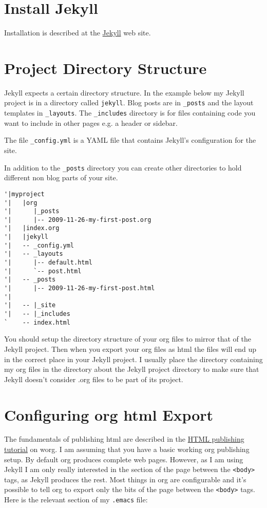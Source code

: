 \documentclass{article}
\begin{document}
\section{Install Jekyll}
\label{sec-2}


Installation is described at the
\href{http://github.com/mojombo/jekyll}{Jekyll} web site.
\section{Project Directory Structure}
\label{sec-3}


Jekyll expects a certain directory structure. In the example below my
Jekyll project is in a directory called \texttt{jekyll}. Blog posts are in
\texttt{\_posts} and the layout templates in \texttt{\_layouts}. The \texttt{\_includes}
directory is for files containing code you want to include in other
pages e.g. a header or sidebar.

The file \texttt{\_config.yml} is a YAML file that contains Jekyll's
configuration for the site.

In addition to the \texttt{\_posts} directory you can create other directories
to hold different non blog parts of your site.


\begin{verbatim}
'|myproject
'|   |org
'|      |_posts
'|      |-- 2009-11-26-my-first-post.org
'|   |index.org
'|   |jekyll
'|   -- _config.yml
'|   -- _layouts
'|      |-- default.html
'|      `-- post.html
'|   -- _posts
'|      |-- 2009-11-26-my-first-post.html
'|
'|   -- |_site
'|   -- |_includes
`    -- index.html
\end{verbatim}

You should setup the directory structure of your org files to mirror
that of the Jekyll project. Then when you export your org files as html
the files will end up in the correct place in your Jekyll project. I
usually place the directory containing my org files in the directory
about the Jekyll project directory to make sure that Jekyll doesn't
consider .org files to be part of its project.
\section{Configuring org html Export}
\label{sec-4}


The fundamentals of publishing html are described in the
\href{http://orgmode.org/worg/org-tutorials/org-publish-html-tutorial.html}{HTML publishing tutorial} on worg. I am assuming that you have a basic
working org publishing setup. By default org produces complete web
pages. However, as I am using Jekyll I am only really interested in the
section of the page between the \texttt{<body>} tags, as Jekyll produces the
rest. Most things in org are configurable and it's possible to tell org
to export only the bits of the page between the \texttt{<body>} tags. Here is
the relevant section of my \texttt{.emacs} file:
\end{document}
